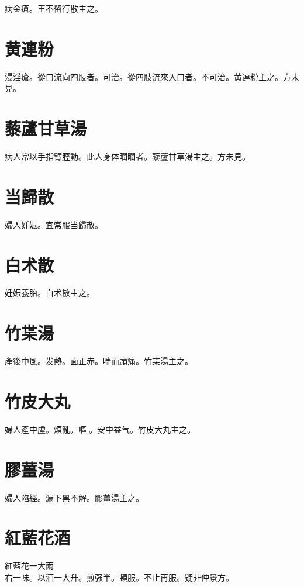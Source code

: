 病金瘡。王不留行散主之。

\section{黄連粉}

浸淫瘡。從口流向四肢者。可治。從四肢流來入口者。不可治。黄連粉主之。{\scriptsize 方未見。}

\section{藜蘆甘草湯}

病人常以手指臂脛動。此人身体瞤瞤者。藜蘆甘草湯主之。{\scriptsize 方未見。}

\section{当歸散}

婦人妊娠。宜常服当歸散。

\section{白术散}

妊娠養胎。白术散主之。

\section{竹枼湯}

產後中風。发熱。面{\khaaitp 正}赤。喘而頭痛。竹枼湯主之。

\section{竹皮大丸}

婦人產中虗。煩亂。嘔{\sungtpii 𠱘}。安中益气。竹皮大丸主之。

\section{膠薑湯}

婦人陷經。漏下黑不解。膠薑湯主之。

\section{紅藍花酒}

紅藍花{\scriptsize 一大兩}\\
右一味。以酒一大升。煎强半。頓服。不止再服。{\scriptsize 疑非仲景方。}{\wuben}

